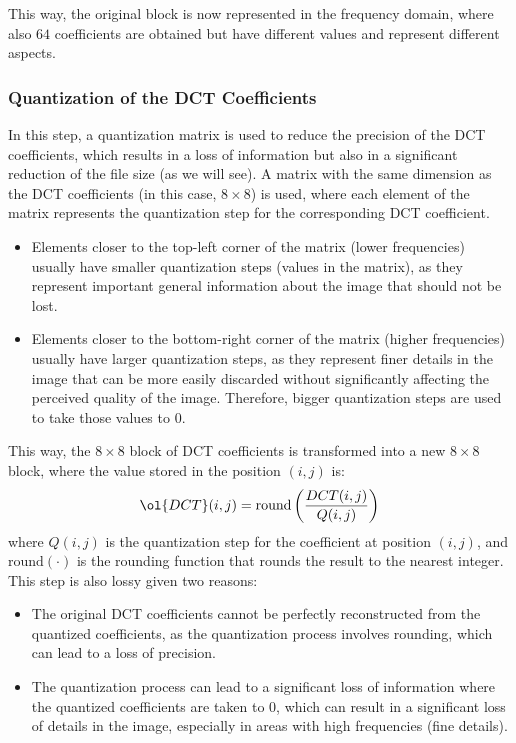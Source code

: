 This way, the original block is now represented in the frequency domain, where also $64$ coefficients are obtained but have different values and represent different aspects.

\subsubsection{Quantization of the DCT Coefficients}

In this step, a quantization matrix is used to reduce the precision of the DCT coefficients, which results in a loss of information but also in a significant reduction of the file size (as we will see). A matrix with the same dimension as the DCT coefficients (in this case, $8\times 8$) is used, where each element of the matrix represents the quantization step for the corresponding DCT coefficient.
\begin{itemize}
    \item Elements closer to the top-left corner of the matrix (lower frequencies) usually have smaller quantization steps (values in the matrix), as they represent important general information about the image that should not be lost.
    \item Elements closer to the bottom-right corner of the matrix (higher frequencies) usually have larger quantization steps, as they represent finer details in the image that can be more easily discarded without significantly affecting the perceived quality of the image. Therefore, bigger quantization steps are used to take those values to $0$.
\end{itemize}

This way, the $8\times 8$ block of DCT coefficients is transformed into a new $8\times 8$ block, where the value stored in the position $(i,j)$ is:
\begin{equation*}
    \ol{DCT}(i,j) = \text{round}\left(\dfrac{DCT(i,j)}{Q(i,j)}\right)
\end{equation*}
where $Q(i,j)$ is the quantization step for the coefficient at position $(i,j)$, and $\text{round}(\cdot)$ is the rounding function that rounds the result to the nearest integer.
This step is also lossy given two reasons:
\begin{itemize}
    \item The original DCT coefficients cannot be perfectly reconstructed from the quantized coefficients, as the quantization process involves rounding, which can lead to a loss of precision.
    \item The quantization process can lead to a significant loss of information where the quantized coefficients are taken to $0$, which can result in a significant loss of details in the image, especially in areas with high frequencies (fine details).
\end{itemize}

